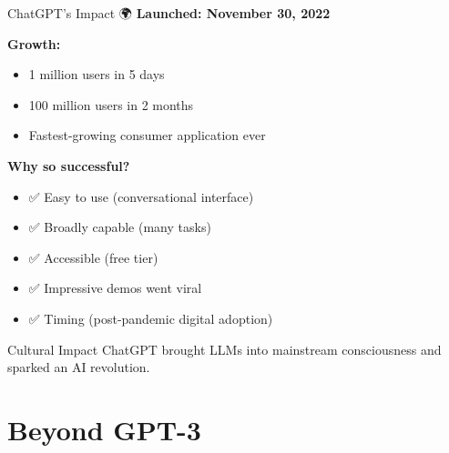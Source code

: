 \documentclass[aspectratio=169]{beamer}
\begin{document}
\begin{frame}[shrink=10]{ChatGPT's Impact 🌍}
    \textbf{Launched: November 30, 2022}

    \vspace{0.3cm}

    \textbf{Growth:}
    \begin{itemize}\setlength{\itemsep}{0pt}
        \item 1 million users in 5 days
        \item 100 million users in 2 months
        \item Fastest-growing consumer application ever
    \end{itemize}

    \vspace{0.3cm}

    \textbf{Why so successful?}
    \begin{itemize}\setlength{\itemsep}{0pt}
        \item ✅ Easy to use (conversational interface)
        \item ✅ Broadly capable (many tasks)
        \item ✅ Accessible (free tier)
        \item ✅ Impressive demos went viral
        \item ✅ Timing (post-pandemic digital adoption)
    \end{itemize}

    \vspace{0.3cm}

    \begin{alertblock}{Cultural Impact}
        ChatGPT brought LLMs into mainstream consciousness and sparked an AI revolution.
    \end{alertblock}
\end{frame}

\section{Beyond GPT-3}
\end{document}
